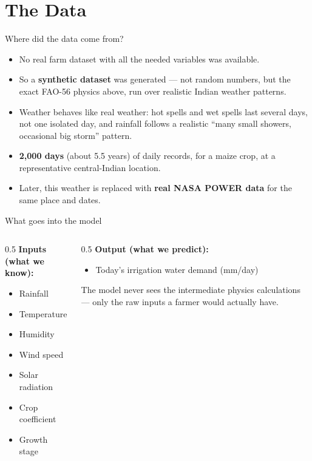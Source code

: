 \documentclass[11pt,aspectratio=169]{beamer}
\begin{document}
\section{The Data}

\begin{frame}{Where did the data come from?}
  \begin{itemize}
    \item No real farm dataset with all the needed variables was available.
    \item So a \textbf{synthetic dataset} was generated --- not random
      numbers, but the exact FAO-56 physics above, run over realistic Indian
      weather patterns.
    \item Weather behaves like real weather: hot spells and wet spells last
      several days, not one isolated day, and rainfall follows a realistic
      ``many small showers, occasional big storm'' pattern.
    \item \textbf{2,000 days} (about 5.5 years) of daily records, for a maize
      crop, at a representative central-Indian location.
    \item Later, this weather is replaced with \textbf{real NASA POWER data}
      for the same place and dates.
  \end{itemize}
\end{frame}

\begin{frame}{What goes into the model}
  \begin{columns}[T]
    \begin{column}{0.5\textwidth}
      \textbf{Inputs (what we know):}
      \begin{itemize}
        \item Rainfall
        \item Temperature
        \item Humidity
        \item Wind speed
        \item Solar radiation
        \item Crop coefficient
        \item Growth stage
      \end{itemize}
    \end{column}
    \begin{column}{0.5\textwidth}
      \textbf{Output (what we predict):}
      \begin{itemize}
        \item Today's irrigation water demand (mm/day)
      \end{itemize}
      \vspace{1em}
      \begin{block}{}
        \small The model never sees the intermediate physics calculations ---
        only the raw inputs a farmer would actually have.
      \end{block}
    \end{column}
  \end{columns}
\end{frame}
\end{document}
